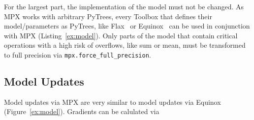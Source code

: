\documentclass[10pt, a4paper, logo, onecolumn, internal, copyright]{dsme}
\newcommand{\mpx}{\textsc{MPX}}
\begin{document}
For the largest part, the implementation of the model must not be changed. 
As \mpx{} works with arbitrary PyTrees, every Toolbox that defines their model/parameters as PyTrees, like Flax~\citep{flax2020github} or Equinox~\citep{kidger2021equinox} can be used in conjunction with \mpx{} (Listing~\ref{ex:model}). 
Only parts of the model that contain critical operations with a high risk of overflows, like sum or mean, must be transformed to full precision via \texttt{mpx.force\_full\_precision}.


\subsection{Model Updates}
\label{sec:eqxvsmpxmodelupdate}
Model updates via \mpx{} are very similar to model updates via Equinox (Figure~\ref{ex:model}). Gradients can be calulated via 
\end{document}

